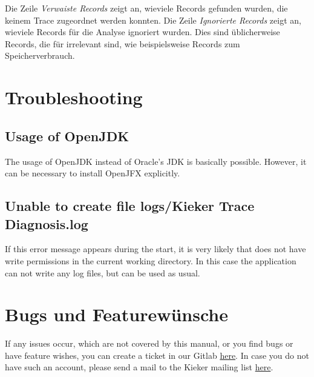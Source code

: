 \documentclass{article}
\begin{document}
  Die Zeile \textit{Verwaiste Records} zeigt an, wieviele Records gefunden wurden, die keinem Trace zugeordnet werden konnten.
  Die Zeile \textit{Ignorierte Records} zeigt an, wieviele Records für die Analyse ignoriert wurden.
  Dies sind üblicherweise Records, die für \KiekerTraceDiagnosis{} irrelevant sind, wie beispielsweise Records zum Speicherverbrauch.

  \section{Troubleshooting}

  \subsection{Usage of OpenJDK}\label{OpenJDK}
  The usage of OpenJDK instead of Oracle's JDK is basically possible.
  However, it can be necessary to install OpenJFX explicitly.

  \subsection{Unable to create file logs/Kieker Trace Diagnosis.log}\label{LogSchreibrechte}
  If this error message appears during the start, it is very likely that \KiekerTraceDiagnosis{}  does not have write permissions in the current working directory.
  In this case the application can not write any log files, but can be used as usual.

  \section{Bugs und Featurewünsche}
  If any issues occur, which are not covered by this manual, or you find bugs or have feature wishes, you can create a ticket in our Gitlab \href{http://build.se.informatik.uni-kiel.de/gitlab/kieker/kieker-trace-diagnosis/issues/}{here}.
  In case you do not have such an account, please send a mail to the Kieker mailing list \href{https://lists.sourceforge.net/lists/listinfo/kieker-users}{here}.
  
\end{document}
